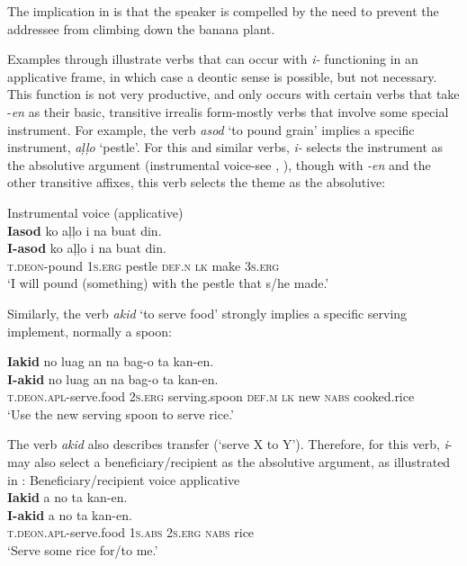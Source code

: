 The implication in  is that the speaker is compelled by the need to prevent the addressee from climbing down the banana plant.

Examples  through  illustrate verbs that can occur with \textit{i-} functioning in an applicative frame, in which case a deontic sense is possible, but not necessary. This function is not very productive, and only occurs with certain verbs that take -\textit{en} as their basic, transitive irrealis form-mostly verbs that involve some special instrument. For example, the verb \textit{asod} ‘to pound grain’ implies a specific instrument, \textit{aļļo} ‘pestle’. For this and similar verbs, \textit{i-} selects the instrument as the absolutive argument (instrumental voice-see , ), though with \textit{{}-en} and the other transitive affixes, this verb selects the theme as the absolutive:

\ea
\label{bkm:Ref460145354}Instrumental voice (applicative) \\
\textbf{Iasod}  ko  aļļo  i  na  buat  din. \\\smallskip
 \gll \textbf{I-asod}  ko  aļļo  i  na  buat  din. \\
\textsc{t.deon}-pound  1\textsc{s.erg}  pestle  \textsc{def.n}  \textsc{lk} make  3\textsc{s.erg} \\
\glt ‘I will pound (something) with the pestle that s/he made.’
\z

Similarly, the verb \textit{akid} ‘to serve food’ strongly implies a specific serving implement, normally a spoon:

\ea
\textbf{Iakid}  no  luag  an  na  bag-o  ta  kan-en. \\\smallskip
 \gll \textbf{I-akid}  no  luag  an  na  bag-o  ta  kan-en. \\
\textsc{t.deon.apl}-serve.food  2\textsc{s.erg}  serving.spoon  \textsc{def.m}  \textsc{lk}  new  \textsc{nabs}  cooked.rice \\
\glt ‘Use the new serving spoon to serve rice.’
\z

The verb \textit{akid} also describes transfer (‘serve X to Y’). Therefore, for this verb, \textit{i}{}- may also select a beneficiary/recipient as the absolutive argument, as illustrated in :
\ea
\label{bkm:Ref447269492}
Beneficiary/recipient voice applicative \\
\textbf{Iakid}  a  no  ta  kan-en. \\\smallskip
 \gll \textbf{I-akid}  a  no  ta  kan-en. \\
\textsc{t.deon.apl}-serve.food  1\textsc{s.abs}  2\textsc{s.erg}  \textsc{nabs}  rice \\
\glt ‘Serve some rice for/to me.’
\z

